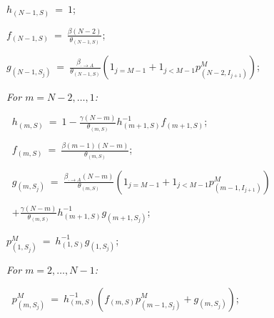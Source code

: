 \documentclass[10pt,A4paper]{article}
\begin{document}
\begin{minipage}{9cm}
\begin{description}
  \item $h_{(N-1,S)} ~=~ 1$;
  \item $f_{(N-1,S)} ~=~ \frac{\beta(N-2)}{\theta_{(N-1,S)}}$;
  \item $g_{(N-1,S_j)} ~=~ \frac{\beta_{\cdot\rightarrow A}}{\theta_{(N-1,S)}}\left(1_{j=M-1}+1_{j<M-1}p^M_{(N-2,I_{j+1})}\right)$;
  \item \it For $m=N-2,\dots,1$:
  \item $~$\hspace{0.5cm} $h_{(m,S)} ~=~ 1-\frac{\gamma(N-m)}{\theta_{(m,S)}}h_{(m+1,S)}^{-1}f_{(m+1,S)}$;
  \item $~$\hspace{0.5cm} $f_{(m,S)} ~=~ \frac{\beta (m-1)(N-m)}{\theta_{(m,S)}}$;
\end{description}
\end{minipage}\begin{minipage}{9cm}
\begin{description}
  \item $~$\hspace{0.5cm} $g_{(m,S_j)} ~=~ \frac{\beta_{\cdot\rightarrow A}(N-m)}{\theta_{(m,S)}}\left(1_{j=M-1}+1_{j<M-1}p^M_{(m-1,I_{j+1})}\right)$\\
  \item $~$\hspace{1.8cm} $+\frac{\gamma(N-m)}{\theta_{(m,S)}}h_{(m+1,S)}^{-1}g_{(m+1,S_j)}$;
  \item $p^M_{(1,S_j)} ~=~ h_{(1,S)}^{-1}g_{(1,S_j)}$;
  \item \it For $m=2,\dots,N-1$:
  \item $~$\hspace{0.5cm} $p^M_{(m,S_j)} ~=~ h_{(m,S)}^{-1}\left(f_{(m,S)}p^M_{(m-1,S_j)}+g_{(m,S_j)}\right)$;
  \item $~$
\end{description}
\end{minipage}
\vspace{0.5cm}
\par {}\\
\end{document}
